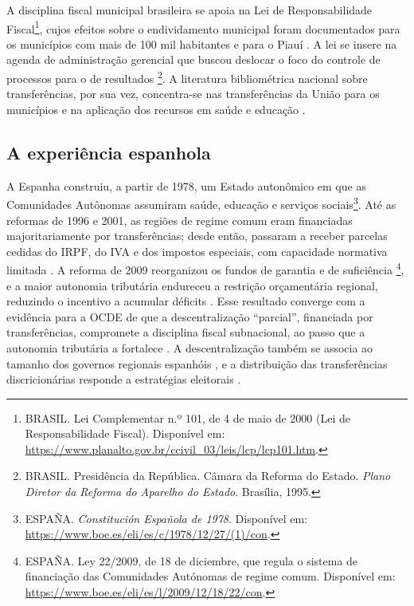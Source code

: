 A disciplina fiscal municipal brasileira se apoia na Lei de Responsabilidade Fiscal\footnote{BRASIL. Lei Complementar n.º 101, de 4 de maio de 2000 (Lei de Responsabilidade Fiscal). Disponível em: \url{https://www.planalto.gov.br/ccivil_03/leis/lcp/lcp101.htm}.}, cujos efeitos sobre o endividamento municipal foram documentados para os municípios com mais de 100 mil habitantes \cite{macedo2009} e para o Piauí \cite{linhares2013}. A lei se insere na agenda de administração gerencial que buscou deslocar o foco do controle de processos para o de resultados \cite{bresserpereira1996}\footnote{BRASIL. Presidência da República. Câmara da Reforma do Estado. \textit{Plano Diretor da Reforma do Aparelho do Estado}. Brasília, 1995.}. A literatura bibliométrica nacional sobre transferências, por sua vez, concentra-se nas transferências da União para os municípios e na aplicação dos recursos em saúde e educação \cite{gomes2012}.

\subsection{A experiência espanhola}

A Espanha construiu, a partir de 1978, um Estado autonômico em que as Comunidades Autônomas assumiram saúde, educação e serviços sociais\footnote{ESPAÑA. \textit{Constitución Española de 1978}. Disponível em: \url{https://www.boe.es/eli/es/c/1978/12/27/(1)/con}.}. Até as reformas de 1996 e 2001, as regiões de regime comum eram financiadas majoritariamente por transferências; desde então, passaram a receber parcelas cedidas do IRPF, do IVA e dos impostos especiais, com capacidade normativa limitada \cite{toboso2010}. A reforma de 2009 reorganizou os fundos de garantia e de suficiência \cite{zabalza2011}\footnote{ESPAÑA. Ley 22/2009, de 18 de diciembre, que regula o sistema de financiação das Comunidades Autónomas de regime comum. Disponível em: \url{https://www.boe.es/eli/es/l/2009/12/18/22/con}.}, e a maior autonomia tributária endureceu a restrição orçamentária regional, reduzindo o incentivo a acumular déficits \cite{arespa2022}. Esse resultado converge com a evidência para a OCDE de que a descentralização ``parcial'', financiada por transferências, compromete a disciplina fiscal subnacional, ao passo que a autonomia tributária a fortalece \cite{asatryan2015}. A descentralização também se associa ao tamanho dos governos regionais espanhóis \cite{cantarero2012}, e a distribuição das transferências discricionárias responde a estratégias eleitorais \cite{simon2013}.

